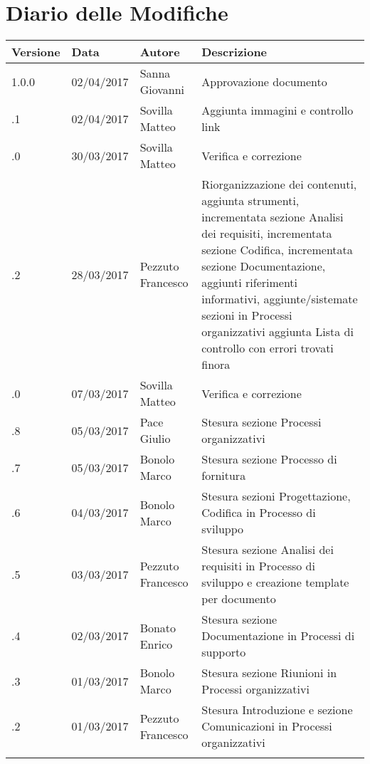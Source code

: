\section*{Diario delle Modifiche}
\begin{longtabu} to \textwidth {
	X[4,l,p]
	X[4,l,p]
	X[4,l,p]
	X[8,l,p]}
	\toprule
		 Versione & Data & Autore & Descrizione \\
		\midrule
		\endhead
		
		1.0.0 & 02/04/2017 & Sanna Giovanni & Approvazione documento\\
		\addlinespace[0.2em]
		\midrule
		.1 & 02/04/2017 & Sovilla Matteo & Aggiunta immagini e controllo link\\
		\addlinespace[0.2em]
		\midrule
		.0 & 30/03/2017 & Sovilla Matteo & Verifica e correzione\\
		\addlinespace[0.2em]
		\midrule
		.2 & 28/03/2017 & Pezzuto Francesco & Riorganizzazione dei contenuti, aggiunta strumenti, incrementata sezione Analisi dei requisiti, incrementata sezione Codifica, incrementata sezione Documentazione, aggiunti riferimenti informativi, aggiunte/sistemate sezioni in Processi organizzativi aggiunta Lista di controllo con errori trovati finora\\
		\addlinespace[0.2em]
		\midrule
		.0 & 07/03/2017 & Sovilla Matteo & Verifica e correzione\\
		\addlinespace[0.2em]
		\midrule
		.8 & 05/03/2017 & Pace Giulio & Stesura sezione Processi organizzativi\\
		\addlinespace[0.2em]
		\midrule
		.7 & 05/03/2017 & Bonolo Marco & Stesura sezione Processo di fornitura\\
		\addlinespace[0.2em]
		\midrule
		.6 & 04/03/2017 & Bonolo Marco & Stesura sezioni Progettazione, Codifica in Processo di sviluppo\\
		\addlinespace[0.2em]
		\midrule
		.5 & 03/03/2017 & Pezzuto Francesco & Stesura sezione Analisi dei requisiti in Processo di sviluppo e creazione template per documento\\
		\addlinespace[0.2em]
		\midrule
		.4 & 02/03/2017 & Bonato Enrico & Stesura sezione Documentazione in Processi di supporto\\
		\addlinespace[0.2em]
		\midrule
		.3 & 01/03/2017 & Bonolo Marco & Stesura sezione Riunioni in Processi organizzativi\\
		\addlinespace[0.2em]
		\midrule
		.2 & 01/03/2017 & Pezzuto Francesco & Stesura Introduzione e sezione Comunicazioni in Processi organizzativi\\
		\addlinespace[0.2em]
		\midrule
		\addlinespace[0.2em]
		
\end{longtabu}
